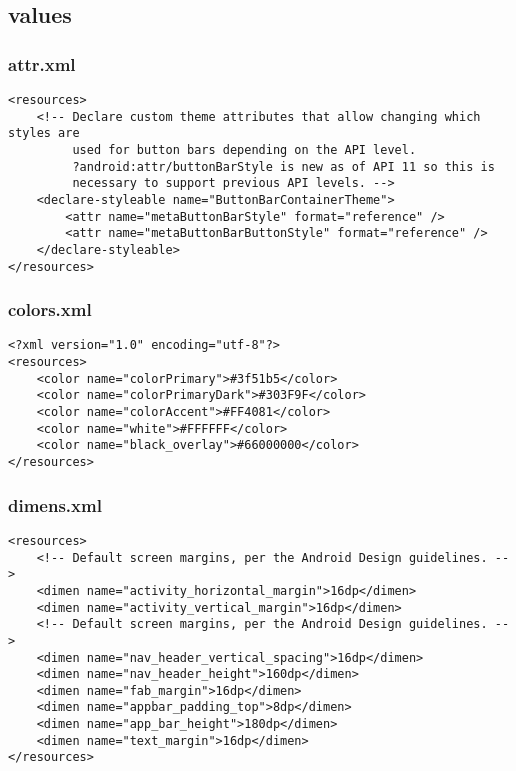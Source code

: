 \subsection{values}
\subsubsection{attr.xml}
\begin{lstlisting}
<resources>
    <!-- Declare custom theme attributes that allow changing which styles are
         used for button bars depending on the API level.
         ?android:attr/buttonBarStyle is new as of API 11 so this is
         necessary to support previous API levels. -->
    <declare-styleable name="ButtonBarContainerTheme">
        <attr name="metaButtonBarStyle" format="reference" />
        <attr name="metaButtonBarButtonStyle" format="reference" />
    </declare-styleable>
</resources>
\end{lstlisting}

\subsubsection{colors.xml}
\begin{lstlisting}
<?xml version="1.0" encoding="utf-8"?>
<resources>
    <color name="colorPrimary">#3f51b5</color>
    <color name="colorPrimaryDark">#303F9F</color>
    <color name="colorAccent">#FF4081</color>
    <color name="white">#FFFFFF</color>
    <color name="black_overlay">#66000000</color>
</resources>
\end{lstlisting}

\subsubsection{dimens.xml}
\begin{lstlisting}
<resources>
    <!-- Default screen margins, per the Android Design guidelines. -->
    <dimen name="activity_horizontal_margin">16dp</dimen>
    <dimen name="activity_vertical_margin">16dp</dimen>
    <!-- Default screen margins, per the Android Design guidelines. -->
    <dimen name="nav_header_vertical_spacing">16dp</dimen>
    <dimen name="nav_header_height">160dp</dimen>
    <dimen name="fab_margin">16dp</dimen>
    <dimen name="appbar_padding_top">8dp</dimen>
    <dimen name="app_bar_height">180dp</dimen>
    <dimen name="text_margin">16dp</dimen>
</resources>
\end{lstlisting}

